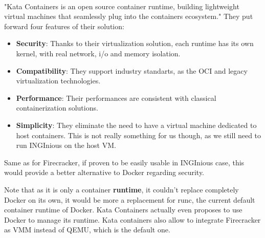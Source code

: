 \paragraph{}"Kata Containers is an open source container runtime, building lightweight virtual machines that seamlessly plug into the containers ecosystem." \cite{kata}  They put forward four features of their solution:
\begin{itemize}
\renewcommand\labelitemi{--}
  \item \textbf{Security}: Thanks to their virtualization solution, each runtime has its own kernel, with real network, i/o and memory isolation.
  \item \textbf{Compatibility}:  They support industry standarts, as the OCI\cite{oci} and legacy virtualization technologies.
  \item \textbf{Performance}:  Their performances are consistent with classical containerization solutions.
  \item \textbf{Simplicity}:  They eliminate the need to have a virtual machine dedicated to host containers.  This is not really something for us though, as we still need to run INGInious on the host VM.
\end{itemize}
Same as for Firecracker, if proven to be easily usable in INGInious case, this would provide a better alternative to Docker regarding security.

Note that as it is only a container \textbf{runtime}, it couldn't replace completely Docker on its own, it would be more a replacement for runc, the current default container runtime of Docker.  Kata Containers actually even proposes to use Docker to manage its runtime.  Kata containers also allow to integrate Firecracker as VMM instead of QEMU, which is the default one.

